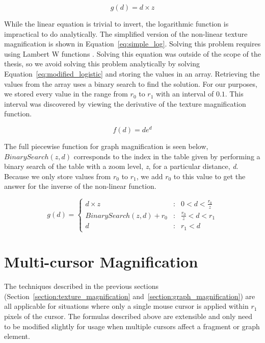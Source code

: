 \begin{equation}
    \label{eq:inverse_linear_magnification}
    g(d) = d \times {z}
\end{equation}

While the linear equation is trivial to invert, the logarithmic function is impractical to do analytically. The 
simplified version of the non-linear texture magnification is shown in Equation~\ref{eq:simple_log}. Solving this 
problem requires using Lambert W functions \cite{Corless1996}. Solving this equation was outside of the scope of the thesis, so we avoid solving this problem analytically by solving Equation~\ref{eq:modified_logistic} and storing the values in an 
array. Retrieving the values from the array uses a binary search to find the solution. For our purposes, we stored every value in the range from $r_0$ to $r_1$ with an interval of $0.1$. This interval was discovered by viewing the derivative of the texture magnification function.

\begin{equation}
    \label{eq:simple_log}
    f(d) = de^{d}
\end{equation}

The full piecewise function for graph magnification is seen below, $BinarySearch(z,d)$ corresponds to the index in the table given by performing a binary search of the table with a zoom level, \emph{z}, for a particular distance, \emph{d}. Because we only store values from $r_0$ to $r_1$, we add $r_0$ to this value to get the answer for the inverse of the non-linear function.

\begin{equation}
    \label{eq:inv_piecewise}
    g(d) = \left\{
        \begin{array}{lcr}
            d \times z & : & 0 < d < \frac{r_0}{z} \\
            BinarySearch(z,d) + r_0 & : & \frac{r_0}{z} < d < r_1\\
            d & : & r_1 < d 
        \end{array}
    \right.
\end{equation}


\section{Multi-cursor Magnification}
\label{section:multi_cursor}

The techniques described in the previous sections (Section~\ref{section:texture_magnification} and~\ref{section:graph_magnification}) are all applicable for
situations where only a single mouse cursor is applied within $r_1$ pixels of the cursor. The formulas 
described above are extensible and only need to be modified slightly for usage when multiple cursors affect
a fragment or graph element.

